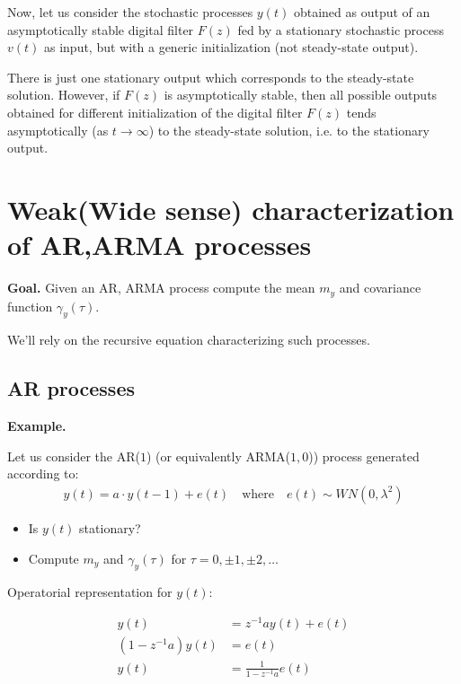 Now, let us consider the stochastic processes $y(t)$ obtained as output of an asymptotically stable digital filter $F(z)$ fed by a stationary stochastic process $v(t)$ as input, but with a generic initialization (not steady-state output).


\begin{theorem}
	There is just one stationary output which corresponds to the steady-state solution. However, if $F(z)$ is asymptotically stable, then all possible outputs obtained for different initialization of the digital filter $F(z)$ tends asymptotically (as $t \rightarrow \infty$) to the steady-state solution, i.e. to the stationary output.
\end{theorem}


\section{Weak(Wide sense) characterization of AR,ARMA processes}
\textbf{Goal.} Given an AR, ARMA process compute the mean $m_y$ and covariance function $\gamma_y(\tau)$.


We'll rely on the recursive equation characterizing such processes.

\subsection{AR processes}
\textbf{Example.}

Let us consider the AR($1$) (or equivalently ARMA($1,0$)) process generated according to:
\begin{align*}
	y(t)=a \cdot y(t-1)+e(t) \quad \text{where} \quad e(t) \sim W N\left(0, \lambda^{2}\right)
\end{align*}

\begin{itemize}
	\item Is $y(t)$ stationary?
	\item Compute $m_{y}$ and $\gamma_{y}(\tau)$ for $\tau=0, \pm 1, \pm 2, \ldots$
\end{itemize}

Operatorial representation for $y(t)$:

\begin{align*}
	y(t)&=z^{-1} a y(t)+e(t) \\
	\left(1-z^{-1} a\right) y(t)&=e(t) \\
	y(t)&=\frac{1}{1-z^{-1} a} e(t)
\end{align*}

